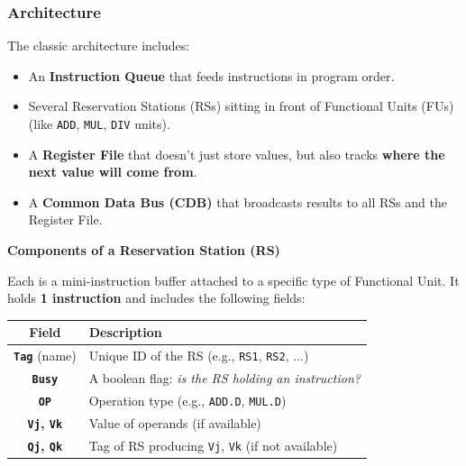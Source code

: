 \subsubsection{Architecture}

The classic architecture includes:
\begin{itemize}
    \item An \textbf{Instruction Queue} that feeds instructions in program order.
    \item Several Reservation Stations (RSs) sitting in front of Functional Units (FUs) (like \texttt{ADD}, \texttt{MUL}, \texttt{DIV} units).
    \item A \textbf{Register File} that doesn't just store values, but also tracks \textbf{where the next value will come from}.
    \item A \textbf{Common Data Bus (CDB)} that broadcasts results to all RSs and the Register File.
\end{itemize}

\highspace
\begin{flushleft}
    \textcolor{Green3}{ \textbf{Components of a Reservation Station (RS)}}
\end{flushleft}
Each  is a mini-instruction buffer attached to a specific type of Functional Unit. It holds \textbf{1 instruction} and includes the following fields:

\begin{table}[!htp]
    \centering
    \begin{tabular}{@{} c | l @{}}
        \toprule
        Field & Description \\
        \midrule
        \textbf{\texttt{Tag}} (name)        & Unique ID of the RS (e.g., \texttt{RS1}, \texttt{RS2}, ...) \\ [.5em]
        \textbf{\texttt{Busy}}              & A boolean flag: \emph{is the RS holding an instruction?} \\ [.5em]
        \textbf{\texttt{OP}}                & Operation type (e.g., \texttt{ADD.D}, \texttt{MUL.D}) \\ [.5em]
        \textbf{\texttt{Vj}, \texttt{Vk}}   & Value of operands (if available) \\ [.5em]
        \textbf{\texttt{Qj}, \texttt{Qk}}   & Tag of RS producing \texttt{Vj}, \texttt{Vk} (if not available) \\
        \bottomrule
    \end{tabular}
\end{table}


